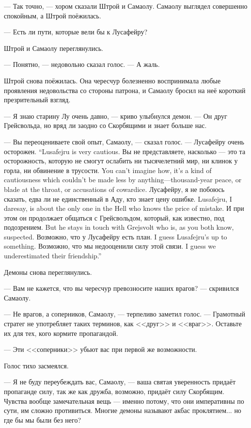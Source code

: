 --- Так точно, --- хором сказали Штрой и Самаолу.
Самаолу выглядел совершенно спокойным, а Штрой поёжилась.

--- Есть ли пути, которые вели бы к Лусафейру?

Штрой и Самаолу переглянулись.

--- Понятно, --- недовольно сказал голос.
--- А жаль.

Штрой снова поёжилась.
Она чересчур болезненно воспринимала любые проявления недовольства со стороны патрона, и Самаолу бросил на неё короткий презрительный взгляд.

--- Я знаю старину Лу очень давно, --- криво улыбнулся демон.
--- Он друг Грейсвольда, но вряд ли заодно со Скорбящими и знает больше нас.

--- Вы переоцениваете свой опыт, Самаолу, --- сказал голос.
{--- Лусафейру очень осторожен.}
{``Lusafejru is very cautious.}
{Вы не представляете, насколько --- это та осторожность, которую не смогут ослабить ни тысячелетний мир, ни клинок у горла, ни обвинение в трусости.}
{You can't imagine how, it's a kind of cautiousness which couldn't be made less by anything---thousand-year peace, or blade at the throat, or accusations of cowardice.}
{Лусафейру, я не побоюсь сказать, едва ли не единственный в Аду, кто знает цену ошибке.}
{Lusafejru, I daresay, is about the only one in the Hell who knows the price of mistake.}
{И при этом он продолжает общаться с Грейсвольдом, который, как известно, под подозрением.}
{But he stays in touch with Grejsvolt who is, as you both know, suspected.}
{Возможно, что у Лусафейру есть план.}
{I guess Lusafejru's up to something.}
{Возможно, что мы недооценили силу этой связи.}
{I guess we underestimated their friendship.''}

Демоны снова переглянулись.

--- Вам не кажется, что вы чересчур превозносите наших врагов? --- скривился Самаолу.

--- Не врагов, а соперников, Самаолу, --- терпеливо заметил голос.
--- Грамотный стратег не употребляет таких терминов, как <<друг>> и <<враг>>.
Оставьте их для тех, кого кормите пропагандой.

--- Эти <<соперники>> убьют вас при первой же возможности.

Голос тихо засмеялся.

--- Я не буду переубеждать вас, Самаолу, --- ваша святая уверенность придаёт пропаганде силу, так же как дружба, возможно, придаёт силу Скорбящим.
Чувства вообще замечательная вещь --- именно потому, что они императивны по сути, им сложно противиться.
Многие демоны называют акбас проклятием... но где бы мы были без него?

